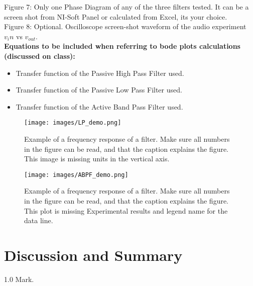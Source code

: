 \documentclass[journal]{IEEEtran}
\begin{document}
Figure 7: Only one Phase Diagram of any of the three filters tested. It can be a screen shot from NI-Soft Panel or calculated from Excel, its your choice.\\

Figure 8: Optional. Oscilloscope screen-shot waveform of the audio experiment $v_in$ vs $v_{out}$.\\[0.1in]

{\bf Equations to be included when referring to bode plots calculations (discussed on class):}
\begin{itemize}

    \item  Transfer function of the Passive High Pass Filter used.
    \item  Transfer function of the Passive Low Pass Filter used.
    \item  Transfer function of the Active Band Pass Filter used. 

\end{itemize}

\setcounter{figure}{4}

\begin{figure}[H]%
\begin {center}
\texttt{[image: images/LP\_demo.png]}
\caption{Example of a frequency response of a filter. Make sure all numbers in the figure can be read, and that the caption explains the figure. This image is missing units in the vertical axis.}
\label{fig:freq_response}
\end {center}
\end{figure}


\begin{figure}[H]%
\begin {center}
\texttt{[image: images/ABPF\_demo.png]}
\caption{Example of a frequency response of a filter. Make sure all numbers in the figure can be read, and that the caption explains the figure. This plot is missing Experimental results and legend name for the data line.}
\label{fig:freq_response2}
\end {center}
\end{figure}




\section{Discussion and Summary}
\begin{flushright} 1.0 Mark. \end{flushright}
\end{document}
